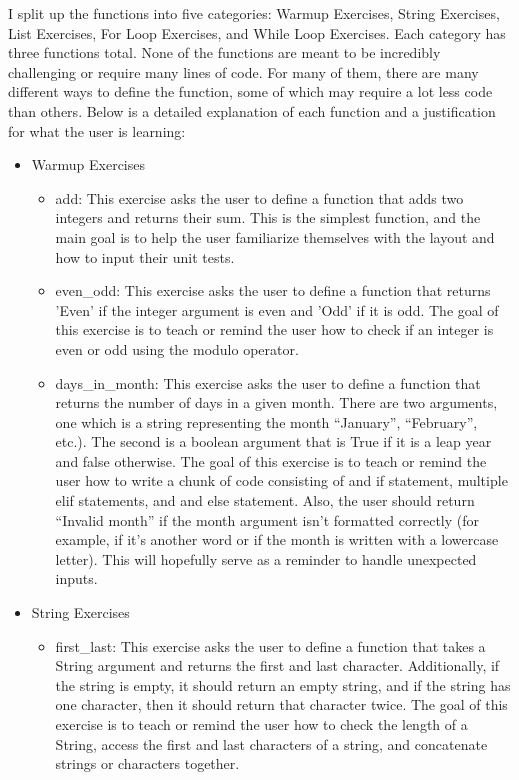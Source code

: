 \documentclass[10pt,twocolumn]{article}
\begin{document}
I split up the functions into five categories: Warmup Exercises, String Exercises, List Exercises, For Loop Exercises, and While Loop Exercises. Each category has three functions total. None of the functions are meant to be incredibly challenging or require many lines of code. For many of them, there are many different ways to define the function, some of which may require a lot less code than others. Below is a detailed explanation of each function and a justification for what the user is learning:

\begin{itemize}
    \item{Warmup Exercises}
    \begin{itemize}
        \item{add: This exercise asks the user to define a function that adds two integers and returns their sum. This is the simplest function, and the main goal is to help the user familiarize themselves with the layout and how to input their unit tests.}
        \item{even\_odd: This exercise asks the user to define a function that returns 'Even' if the integer argument is even and 'Odd' if it is odd. The goal of this exercise is to teach or remind the user how to check if an integer is even or odd using the modulo operator.}
        \item{days\_in\_month: This exercise asks the user to define a function that returns the number of days in a given month. There are two arguments, one which is a string representing the month \enquote{January}, \enquote{February}, etc.). The second is a boolean argument that is True if it is a leap year and false otherwise. The goal of this exercise is to teach or remind the user how to write a chunk of code consisting of and if statement, multiple elif statements, and and else statement. Also, the user should return \enquote{Invalid month} if the month argument isn't formatted correctly (for example, if it's another word or if the month is written with a lowercase letter). This will hopefully serve as a reminder to handle unexpected inputs.}
    \end{itemize}
    \item{String Exercises}
    \begin{itemize}
        \item{first\_last: This exercise asks the user to define a function that takes a String argument and returns the first and last character. Additionally, if the string is empty, it should return an empty string, and if the string has one character, then it should return that character twice. The goal of this exercise is to teach or remind the user how to check the length of a String, access the first and last characters of a string, and concatenate strings or characters together.}

\end{itemize}
\end{itemize}
\end{document}
